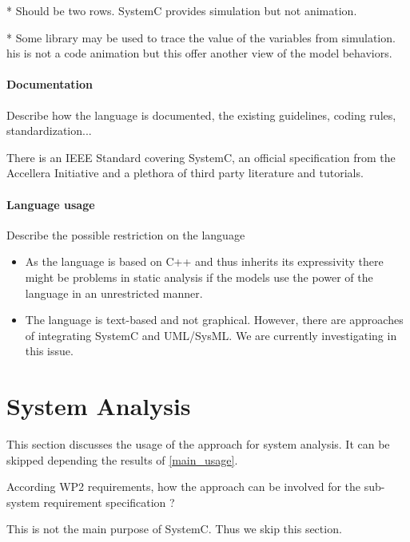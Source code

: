 \begin{author_comment}
* Should be two rows. SystemC provides simulation but not animation.
\end{author_comment}
\begin{assessor1}
* Some library may be used to trace the value of  the variables from
simulation. his is not a code animation but this offer another view of
the model behaviors.
\end{assessor1}

\paragraph{Documentation} Describe how the language is documented, the existing guidelines, coding rules, standardization...

There is an IEEE Standard covering SystemC, an official specification from the Accellera Initiative and a plethora of third party literature and tutorials.

\paragraph{Language usage} Describe the possible restriction on the language

\begin{itemize}
\item As the language is based on C++ and thus inherits its expressivity there might be problems in static analysis if the models use the power of the language in an unrestricted manner.
\item The language is text-based and not graphical. However, there are approaches of integrating SystemC and UML/SysML. We are currently investigating in this issue.
\end{itemize}


\section{System Analysis}
This section discusses the usage of the approach for system analysis.
It can be skipped depending the results of \ref{main_usage}.

According WP2 requirements, how the approach can be involved for the sub-system requirement specification ?

\begin{author_comment}
This is not the main purpose of SystemC. Thus we skip this section.
\end{author_comment}

